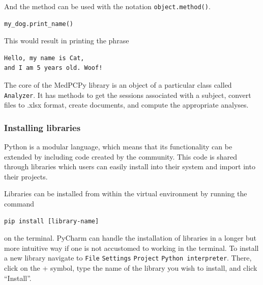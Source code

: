 \documentclass[a4paper,12pt]{article}
\begin{document}
And the method can be used with the notation \verb|object.method()|.

\begin{tcolorbox}[
    enhanced,
    attach boxed title to top left={xshift=6mm,yshift=-3mm},
    colback=lightgreen!20,
    colframe=lightgreen,
    colbacktitle=lightgreen,
    title=Python,
    fonttitle=\bfseries\color{black},
    boxed title style={size=small,colframe=lightgreen,sharp corners},
    sharp corners,
    ]
    \begin{verbatim}
my_dog.print_name()
    \end{verbatim}
\end{tcolorbox}

This would result in printing the phrase

\begin{tcolorbox}[
    enhanced,
    attach boxed title to top left={xshift=6mm,yshift=-3mm},
    colback=lightgray!20,
    colframe=lightgray,
    colbacktitle=lightgray,
    title=Output,
    fonttitle=\bfseries\color{black},
    boxed title style={size=small,colframe=lightgray,sharp corners},
    sharp corners,
    ]
    \begin{verbatim}
Hello, my name is Cat,
and I am 5 years old. Woof!
    \end{verbatim}
\end{tcolorbox}

The core of the MedPCPy library is an object of a particular class called \verb|Analyzer|. It has methods to get the sessions associated with a subject, convert files to .xlsx format, create documents, and compute the appropriate analyses.

\subsubsection{Installing libraries}

Python is a modular language, which means that its functionality can be extended by including code created by the community. This code is shared through libraries which users can easily install into their system and import into their projects.

Libraries can be installed from within the virtual environment by running the command

\begin{tcolorbox}[
    enhanced,
    attach boxed title to top left={xshift=6mm,yshift=-3mm},
    colback=lightgreen!20,
    colframe=lightgreen,
    sharp corners,
    ]
    \begin{verbatim}
pip install [library-name]
    \end{verbatim}
\end{tcolorbox}
\noindent on the terminal. PyCharm can handle the installation of libraries in a longer but more intuitive way if one is not accustomed to working in the terminal. To install a new library navigate to \verb|File| \textrightarrow \verb|Settings| \textrightarrow \verb|Project| \textrightarrow \verb|Python interpreter|. There, click on the + symbol, type the name of the library you wish to install, and click ``Install''.
\end{document}
